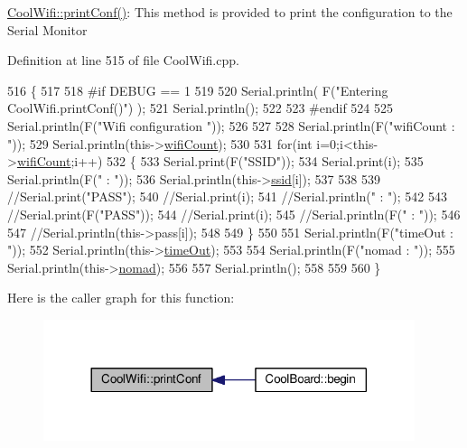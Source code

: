 \hyperlink{class_cool_wifi_a9e6105c6d13d35ec510f6633da9e0223}{Cool\+Wifi\+::print\+Conf()}\+: This method is provided to print the configuration to the Serial Monitor 

Definition at line 515 of file Cool\+Wifi.\+cpp.


\begin{DoxyCode}
516 \{
517 
518 \textcolor{preprocessor}{#if DEBUG == 1 }
519 
520     Serial.println( F(\textcolor{stringliteral}{"Entering CoolWifi.printConf()"}) );
521     Serial.println();   
522 
523 \textcolor{preprocessor}{#endif}
524     
525     Serial.println(F(\textcolor{stringliteral}{"Wifi configuration "}));
526 
527     
528     Serial.println(F(\textcolor{stringliteral}{"wifiCount : "}));
529     Serial.println(this->\hyperlink{class_cool_wifi_ab133bd92fcb895b884deecd6678592e4}{wifiCount});
530     
531     \textcolor{keywordflow}{for}(\textcolor{keywordtype}{int} i=0;i<this->\hyperlink{class_cool_wifi_ab133bd92fcb895b884deecd6678592e4}{wifiCount};i++)
532     \{   
533         Serial.print(F(\textcolor{stringliteral}{"SSID"}));
534         Serial.print(i);
535         Serial.println(F(\textcolor{stringliteral}{" : "}));
536         Serial.println(this->\hyperlink{class_cool_wifi_a893b21d0fed821438733bba2e73fb4c2}{ssid}[i]);
537                 
538 
539         \textcolor{comment}{//Serial.print("PASS");}
540         \textcolor{comment}{//Serial.print(i);}
541         \textcolor{comment}{//Serial.println(" : ");}
542 
543         \textcolor{comment}{//Serial.print(F("PASS"));}
544         \textcolor{comment}{//Serial.print(i);}
545         \textcolor{comment}{//Serial.println(F(" : "));}
546 
547         \textcolor{comment}{//Serial.println(this->pass[i]);}
548         
549     \}
550     
551     Serial.println(F(\textcolor{stringliteral}{"timeOut : "}));
552     Serial.println(this->\hyperlink{class_cool_wifi_a952111605f25156588b5632caaba1c6f}{timeOut});
553 
554     Serial.println(F(\textcolor{stringliteral}{"nomad : "}));
555     Serial.println(this->\hyperlink{class_cool_wifi_ab7d9643c4af7bac3be331ef008b2ea27}{nomad});
556 
557     Serial.println();
558 
559 
560 \}
\end{DoxyCode}
Here is the caller graph for this function\+:\nopagebreak
\begin{figure}[H]
\begin{center}
\leavevmode
\includegraphics[width=308pt]{d7/d29/class_cool_wifi_a9e6105c6d13d35ec510f6633da9e0223_icgraph}
\end{center}
\end{figure}
\mbox{\label{class_cool_wifi_a1c7b4d82a4098d346e7593dce92039fa}} 

